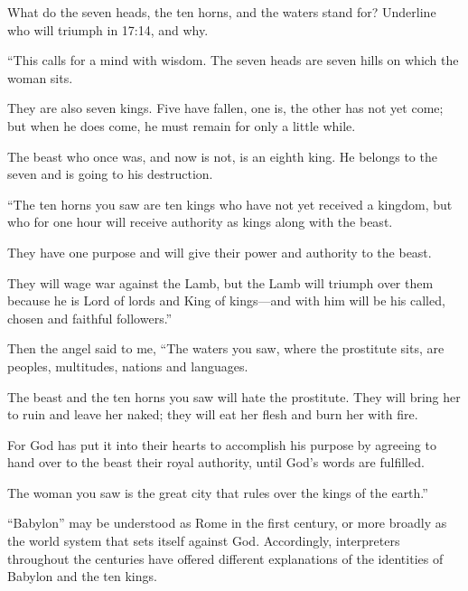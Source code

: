 \begin{ScriptureBox2}{What do the seven heads, the ten horns, and the waters stand for? Underline who will triumph in 17:14, and why.}

\item[17:9] ``This calls for a mind with wisdom. The seven heads are seven hills on which the woman sits.

\item[17:10] They are also seven kings. Five have fallen, one is, the other has not yet come; but when he does come, he must remain for only a little while.

\item[17:11] The beast who once was, and now is not, is an eighth king. He belongs to the seven and is going to his destruction.

\item[17:12] ``The ten horns you saw are ten kings who have not yet received a kingdom, but who for one hour will receive authority as kings along with the beast.

\item[17:13] They have one purpose and will give their power and authority to the beast.

\item[17:14] They will wage war against the Lamb, but the Lamb will triumph over them because he is Lord of lords and King of kings---and with him will be his called, chosen and faithful followers.''

\item[17:15] Then the angel said to me, ``The waters you saw, where the prostitute sits, are peoples, multitudes, nations and languages.

\item[17:16] The beast and the ten horns you saw will hate the prostitute. They will bring her to ruin and leave her naked; they will eat her flesh and burn her with fire.

\item[17:17] For God has put it into their hearts to accomplish his purpose by agreeing to hand over to the beast their royal authority, until God's words are fulfilled.

\item[17:18] The woman you saw is the great city that rules over the kings of the earth.''

\end{ScriptureBox2}

“Babylon” may be understood as Rome in the first century, or more broadly as the world system that sets itself against God. Accordingly, interpreters throughout the centuries have offered different explanations of the identities of Babylon and the ten kings.


